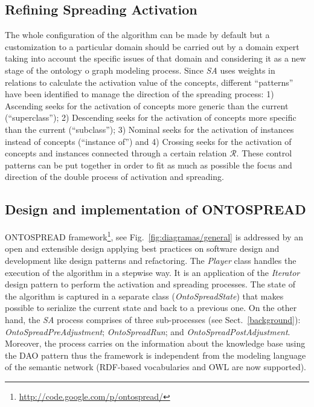 \subsection{Refining Spreading Activation}
The whole configuration of the algorithm can be made by default but a customization
to a particular domain should be carried out by a domain expert taking into account the
specific issues of that domain and considering it as a new stage of 
the ontology o graph modeling process. Since \textit{SA} uses weights in relations  to calculate the activation
value of the concepts, different ``patterns'' have been identified to manage the direction 
of the spreading process: 1) Ascending seeks for the activation of concepts more generic than
the current (``superclass''); 2) Descending seeks for the activation of concepts more specific than
the current (``subclass''); 3) Nominal seeks for the activation of instances instead of concepts (``instance of'')
and 4) Crossing  seeks for the activation of concepts and instances connected through a certain relation $\mathcal{R}$.
These control patterns can be put together in order to fit as much as possible the focus and 
direction of the double process of activation and spreading.

\subsection{Design and implementation of ONTOSPREAD}
ONTOSPREAD framework\footnote{\url{http://code.google.com/p/ontospread/}}, see Fig.~\ref{fig:diagramas/general}
 is addressed by an open and extensible design applying best practices on software design and development like design patterns and refactoring. 
The \textit{Player} class handles the execution of the algorithm in a  stepwise way. It is 
an application of the \textit{Iterator} design pattern to perform the activation and spreading processes. The state of 
the algorithm is captured in a separate class (\textit{OntoSpreadState}) that makes possible to serialize the 
current state and back to a previous one. On the other hand, the \textit{SA} process comprises of three sub-processes 
(see Sect.~\ref{background}): \textit{OntoSpreadPreAdjustment}; \textit{OntoSpreadRun}; and \textit{OntoSpreadPostAdjustment}. Moreover, 
the process carries on the information about the knowledge base using the DAO pattern thus the 
framework is independent from the modeling language of the semantic network (RDF-based vocabularies and OWL are now supported).

